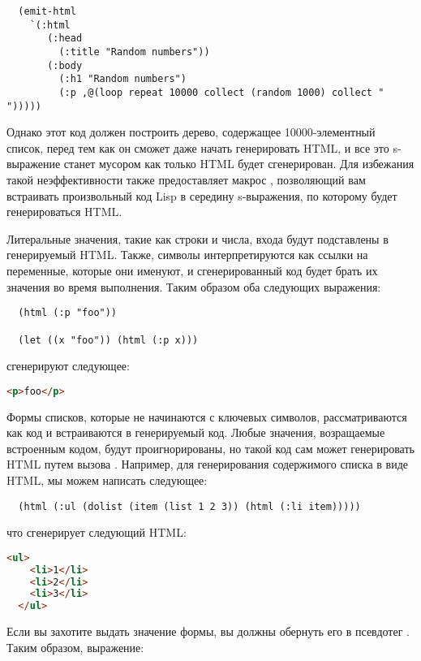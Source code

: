 \begin{lstlisting}
  (emit-html
    `(:html
       (:head
         (:title "Random numbers"))
       (:body 
         (:h1 "Random numbers")
         (:p ,@(loop repeat 10000 collect (random 1000) collect " ")))))
\end{lstlisting}

Однако этот код должен построить дерево, содержащее 10000-элементный список, перед тем как
он сможет даже начать генерировать HTML, и все это s-выражение станет мусором как только
HTML будет сгенерирован. Для избежания такой неэффективности  также
предоставляет макрос , позволяющий вам встраивать произвольный код Lisp в
середину s-выражения, по которому будет генерироваться HTML.

Литеральные значения, такие как строки и числа, входа  будут подставлены в
генерируемый HTML. Также, символы интерпретируются как ссылки на переменные, которые они
именуют, и сгенерированный код будет брать их значения во время выполнения. Таким образом
оба следующих выражения:

\begin{lstlisting}
  (html (:p "foo"))

  (let ((x "foo")) (html (:p x)))
\end{lstlisting}

сгенерируют следующее:

\begin{lstlisting}[language=HTML]
  <p>foo</p>
\end{lstlisting}

Формы списков, которые не начинаются с ключевых символов, рассматриваются как код и
встраиваются в генерируемый код. Любые значения, возращаемые встроенным кодом, будут
проигнорированы, но такой код сам может генерировать HTML путем вызова
. Например, для генерирования содержимого списка в виде HTML, мы можем написать
следующее:

\begin{lstlisting}
  (html (:ul (dolist (item (list 1 2 3)) (html (:li item)))))
\end{lstlisting}

что сгенерирует следующий HTML:

\begin{lstlisting}[language=HTML]
  <ul>
    <li>1</li>
    <li>2</li>
    <li>3</li>
  </ul>
\end{lstlisting}

Если вы захотите выдать значение формы, вы должны обернуть его в псевдотег
. Таким образом, выражение:

